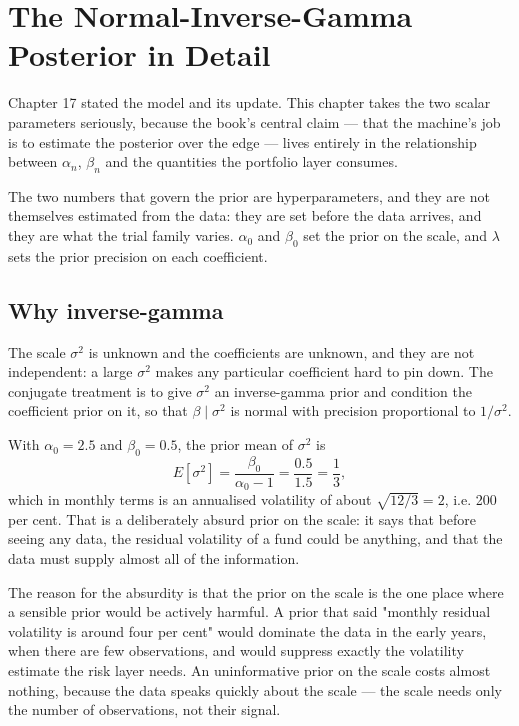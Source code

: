 
\chapter{The Normal-Inverse-Gamma Posterior in Detail}
\label{ch:nig}

Chapter 17 stated the model and its update. This chapter takes the two
scalar parameters seriously, because the book's central claim --- that
the machine's job is to estimate the posterior over the edge --- lives
entirely in the relationship between \(\alpha_n\), \(\beta_n\) and the
quantities the portfolio layer consumes.

The two numbers that govern the prior are hyperparameters, and they are
not themselves estimated from the data: they are set before the data
arrives, and they are what the trial family varies. \(\alpha_0\) and
\(\beta_0\) set the prior on the scale, and \(\lambda\) sets the prior
precision on each coefficient.

\section{Why inverse-gamma}

The scale \(\sigma^2\) is unknown and the coefficients are unknown, and
they are not independent: a large \(\sigma^2\) makes any particular
coefficient hard to pin down. The conjugate treatment is to give
\(\sigma^2\) an inverse-gamma prior and condition the coefficient prior
on it, so that \(\beta \mid \sigma^2\) is normal with precision proportional
to \(1/\sigma^2\).

With \(\alpha_0 = 2.5\) and \(\beta_0 = 0.5\), the prior mean of
\(\sigma^2\) is
\begin{equation}
E[\sigma^2] = \frac{\beta_0}{\alpha_0 - 1} = \frac{0.5}{1.5} = \frac{1}{3},
\end{equation}
which in monthly terms is an annualised volatility of about
\(\sqrt{12/3} = 2\), i.e. 200 per cent. That is a deliberately absurd
prior on the scale: it says that before seeing any data, the residual
volatility of a fund could be anything, and that the data must supply
almost all of the information.

The reason for the absurdity is that the prior on the scale is the one
place where a sensible prior would be actively harmful. A prior that said
"monthly residual volatility is around four per cent" would dominate the
data in the early years, when there are few observations, and would
suppress exactly the volatility estimate the risk layer needs. An
uninformative prior on the scale costs almost nothing, because the data
speaks quickly about the scale --- the scale needs only the number of
observations, not their signal.

